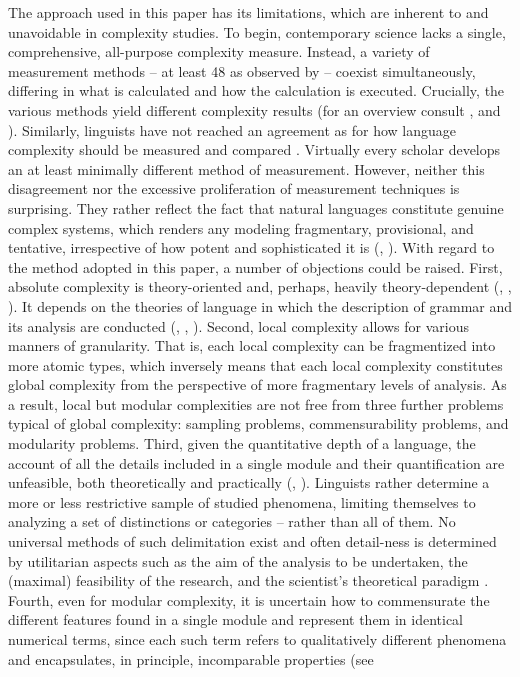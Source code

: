 \documentclass[output=paper,hidelinks]{langscibook}
\begin{document}
The approach used in this paper has its limitations, which are inherent to and unavoidable in complexity studies. To begin, contemporary science lacks a single, comprehensive, all-purpose complexity measure. Instead, a variety of measurement methods -- at least 48 as observed by \citet{edmonds_syntactic_1999} -- coexist simultaneously, differing in what is calculated and how the calculation is executed. Crucially, the various methods yield different complexity results (for an overview consult \citealt{peliti_measures_1988, badii_complexity_1997, rescher_complexity_1998, edmonds_syntactic_1999, shalizi_methods_2006}, and \citealt{mitchell_complexity_2009}). Similarly, linguists have not reached an agreement as for how language complexity should be measured and compared \citep[7]{newmeyer_introduction_2014}. Virtually every scholar develops an at least minimally different method of measurement. However, neither this disagreement nor the excessive proliferation of measurement techniques is surprising. They rather reflect the fact that natural languages constitute genuine complex systems, which renders any modeling fragmentary, provisional, and tentative, irrespective of how potent and sophisticated it is (\citealt[3]{cilliers_complexity_2013}, \citealt{andrason_grammar_2016}). With regard to the method adopted in this paper, a number of objections could be raised. First, absolute complexity is theory-oriented and, perhaps, heavily theory-dependent (\citealt[24]{miestamo_grammatical_2008}, \citealt[5, 8]{kusters_complexity_2008}, \citealt[289]{hammarstrom_complexity_2008}). It depends on the theories of language in which the description of grammar and its analysis are conducted (\citealt[27]{miestamo_grammatical_2008}, \citealt[5, 7--8]{kusters_complexity_2008}, \citealt[289]{hammarstrom_complexity_2008}). Second, local complexity allows for various manners of granularity. That is, each local complexity can be fragmentized into more atomic types, which inversely means that each local complexity constitutes global complexity from the perspective of more fragmentary levels of analysis. As a result, local but modular complexities are not free from three further problems typical of global complexity: sampling problems, commensurability problems, and modularity problems. Third, given the quantitative depth of a language, the account of all the details included in a single module and their quantification are unfeasible, both theoretically and practically (\citealt[30]{miestamo_feasibility_2006}, \citeyear{miestamo_language_2008}). Linguists rather determine a more or less restrictive sample of studied phenomena, limiting themselves to analyzing a set of distinctions or categories – rather than all of them. No universal methods of such delimitation exist and often detail-ness is determined by utilitarian aspects such as the aim of the analysis to be undertaken, the (maximal) feasibility of the research, and the scientist's theoretical paradigm \citep[248]{deutscher_overall_2009}. Fourth, even for modular complexity, it is uncertain how to commensurate the different features found in a single module and represent them in identical numerical terms, since each such term refers to qualitatively different phenomena and encapsulates, in principle, incomparable properties (see 
\end{document}
